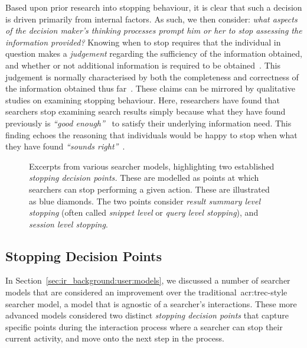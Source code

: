 Based upon prior research into stopping behaviour, it is clear that such a decision is driven primarily from internal factors. As such, we then consider: \emph{what aspects of the decision maker's thinking processes prompt him or her to stop assessing the information provided?} Knowing when to stop requires that the individual in question makes a \emph{judgement} regarding the sufficiency of the information obtained, and whether or not additional information is required to be obtained~\citep{browne2004stopping_rules}. This judgement is normally characterised by both the completeness and correctness of the information obtained thus far~\citep{smith1991belief}. These claims can be mirrored by qualitative studies on examining stopping behaviour. Here, researchers have found that searchers stop examining search results simply because what they have found previously is \emph{``good enough''}~\citep{zach2005enough_is_enough} to satisfy their underlying information need. This finding echoes the reasoning that individuals would be happy to stop when what they have found \emph{``sounds right''}~\citep{perkins1983difficulties}.

\begin{figure}[t!]
    \centering
    \caption[Two established \emph{stopping decision points}]{Excerpts from various searcher models, highlighting two established \emph{stopping decision points.} These are modelled as points at which searchers can stop performing a given action. These are illustrated as blue diamonds. The two points consider  \emph{result summary level stopping} (often called \emph{snippet level} or \emph{query level stopping}), and  \emph{session level stopping}.}
    \label{fig:model_two_points}
\end{figure}

\subsection{Stopping Decision Points}\label{sec:stopping_background:why:points}
In Section~\ref{sec:ir_background:user:models}, we discussed a number of searcher models that are considered an improvement over the traditional~\gls{acr:trec}-style searcher model, a model that is agnostic of a searcher's interactions. These more advanced models considered two distinct \emph{stopping decision points} that capture specific points during the interaction process where a searcher can stop their current activity, and move onto the next step in the process.

